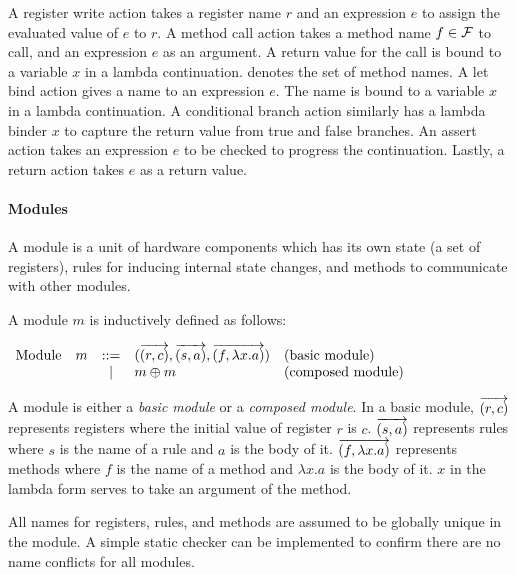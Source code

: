 A register write action takes a register name $r$ and an expression
$e$ to assign the evaluated value of $e$ to $r$. A method call action
takes a method name $f \in \mathcal{F}{}$ to call, and an expression $e$
as an argument. A return value for the call is bound to a variable $x$
in a lambda continuation. \setmeths{} denotes the set of method
names. A let bind action gives a name to an expression $e$. The name
is bound to a variable $x$ in a lambda continuation. A conditional
branch action similarly has a lambda binder $x$ to capture the return
value from true and false branches. An assert action takes an
expression $e$ to be checked to progress the continuation. Lastly, a
return action takes $e$ as a return value.

\paragraph{Modules}
A module is a unit of hardware components which has its own state (a
set of registers), rules for inducing internal state changes, and
methods to communicate with other modules.

\begin{definition}
  \label{def-module}
  A module $m$ is inductively defined as follows:
  \begin{center}
    \begin{math}
      \begin{array}{rcll}
        \textrm{Module}\quad m & ::=
        & (\overrightarrow{(r, c)}, \overrightarrow{(s, a)}, \overrightarrow{(f, \lambda x.a)})
        & \textrm{(basic module)} \\
        & | & m \oplus m & \textrm{(composed module)}
      \end{array}
    \end{math}
  \end{center}
\end{definition}

A module is either a \emph{basic module} or a \emph{composed module}.
In a basic module, $\overrightarrow{(r, c)}$ represents registers
where the initial value of register $r$ is $c$.
$\overrightarrow{(s, a)}$ represents rules where $s$ is the name of a
rule and $a$ is the body of it. $\overrightarrow{(f, \lambda x.a)}$
represents methods where $f$ is the name of a method and $\lambda x.a$
is the body of it. $x$ in the lambda form serves to take an argument
of the method.

All names for registers, rules, and methods are assumed to be globally
unique in the module. A simple static checker can be implemented to
confirm there are no name conflicts for all modules.

